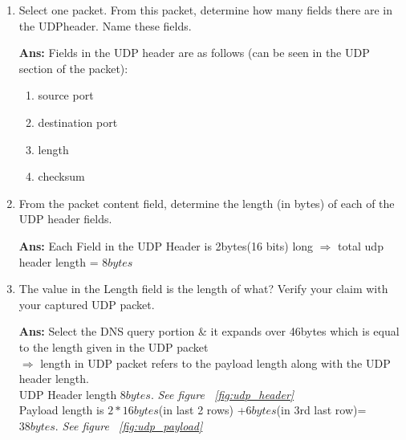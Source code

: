 \documentclass[a4,11pt]{article}
\newenvironment{que}
{ \color{YellowGreen}
  \begin{question}
}
{ \end{question} }
\newenvironment{sol}
{ \color{Black}
  \begin{solution}
}
{ \end{solution} }
\begin{document}
  \begin{enumerate}
   \item 
   \begin{que}
    Select one packet. From this packet, determine how many fields there are in the UDPheader. Name these fields.
   \end{que}

   \begin{sol}
   \textbf{Ans:} Fields in the UDP header are as follows (can be seen in the UDP section of the packet): 
   \begin{multicols}{2}
      \begin{enumerate}
	\item source port
	\item destination port
	\item length
	\item checksum
      \end{enumerate}
    \end{multicols} 
   \end{sol}

   
  \item
  \begin{que}
    From the packet content field, determine the length (in bytes) of each of the UDP header fields. 
  \end{que}

  \begin{sol}
   \textbf{Ans:}  Each Field in the UDP Header is 2bytes(16 bits) long $\Rightarrow$ total udp header length = $8bytes$
  \end{sol}
  
  
  \item
  \begin{que}
   The value in the Length field is the length of what? Verify your claim with your captured UDP packet.
  \end{que}

  \begin{sol}
  \textbf{Ans:} Select the DNS query portion \& it expands over 46bytes which is equal to the length given in the UDP packet \\
      $\Rightarrow$ length in UDP packet refers to the payload length along with the UDP header length. \\
         
      UDP Header length $8bytes$. \textit{See figure ~\ref{fig:udp_header} }\\
      Payload length is $2*16 bytes$(in last 2 rows) +$6 bytes$(in 3rd last row)= $38bytes$. \textit{See figure ~\ref{fig:udp_payload}}
   \end{sol} 


\end{enumerate}
\end{document}
